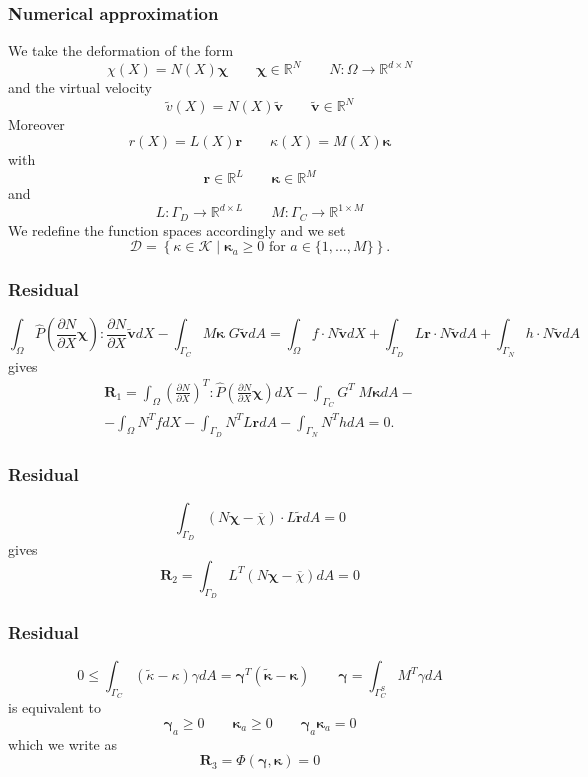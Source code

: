 \documentclass[8pt]{beamer}
\numberwithin{equation}{section}
\theoremstyle{definition}
\newcommand{\dind}[2]{\frac{\partial #1}{\partial #2}}
\begin{document}
\begin{frame}
\frametitle{Numerical approximation}
We take the deformation of the form
\[
\chi(X)=N(X)\boldsymbol{\chi}\qquad\boldsymbol{\chi}\in\mathbb{R}^N\qquad N\colon\Omega\to\mathbb{R}^{d\times N}
\]
and the virtual velocity
\[
\tilde{v}(X)=N(X)\tilde{\boldsymbol{v}}\qquad\tilde{\boldsymbol{v}}\in\mathbb{R}^N
\]
Moreover
\[
r(X)=L(X)\boldsymbol{r}\qquad\kappa(X)=M(X)\boldsymbol{\kappa}
\]
with
\[\boldsymbol{r}\in\mathbb{R}^L\qquad\boldsymbol{\kappa}\in\mathbb{R}^M
\]
and
\[
L\colon\Gamma_D\to\mathbb{R}^{d\times L}\qquad M\colon\Gamma_C\to\mathbb{R}^{1\times M}
\]
We redefine the function spaces accordingly and we set
\[
\mathscr{D}=\left\{\kappa\in\mathscr{K}\middle|\text{$\boldsymbol{\kappa}_a\ge0$ for $a\in\{1,\dots,M\}$}\right\}.
\]
\end{frame}

\begin{frame}
\frametitle{Residual}
\[
\int_\Omega\hat{P}\left(\dind{N}{X}\boldsymbol\chi\right):\dind{N}{X}\tilde{\boldsymbol{v}}dX-\int_{\Gamma_C}M\boldsymbol\kappa\; G\tilde{\boldsymbol{v}}dA=\int_\Omega f\cdot N\tilde{\boldsymbol{v}}dX+\int_{\Gamma_D}L\boldsymbol r\cdot N\tilde{\boldsymbol{v}}dA+\int_{\Gamma_N}h\cdot N\tilde{\boldsymbol{v}}dA
\]
\centering gives
\begin{multline*}
\boldsymbol{R}_1=\int_\Omega\left(\dind{N}{X}\right)^T:\hat{P}\left(\dind{N}{X}\boldsymbol\chi\right)dX-\int_{\Gamma_C}G^T\;M\boldsymbol\kappa dA-\\
-\int_\Omega N^TfdX-\int_{\Gamma_D}N^TL\boldsymbol rdA-\int_{\Gamma_N}N^ThdA=0.
\end{multline*}
\end{frame}

\begin{frame}
\frametitle{Residual}
\[
\int_{\Gamma_D}(N\boldsymbol{\chi}-\overline{\chi})\cdot L\tilde{\boldsymbol{r}}dA=0
\]
\centering gives
\[
\boldsymbol{R}_2=\int_{\Gamma_D}L^T(N\boldsymbol{\chi}-\overline{\chi})dA=0
\]
\end{frame}

\begin{frame}
\frametitle{Residual}
\[
0\le\int_{\Gamma_C}(\tilde\kappa-\kappa)\gamma dA=\boldsymbol{\gamma}^T(\tilde{\boldsymbol{\kappa}}-\boldsymbol{\kappa})\qquad\boldsymbol\gamma=\int_{\Gamma_C^S}M^T\gamma dA
\]
\centering is equivalent to
\[
\boldsymbol{\gamma}_a\ge0\qquad\boldsymbol{\kappa}_a\ge0\qquad\boldsymbol{\gamma}_a\boldsymbol{\kappa}_a=0
\]
which we write as
\[
\boldsymbol{R}_3=\Phi(\boldsymbol{\gamma},\boldsymbol{\kappa})=0
\]
\end{frame}
\end{document}
